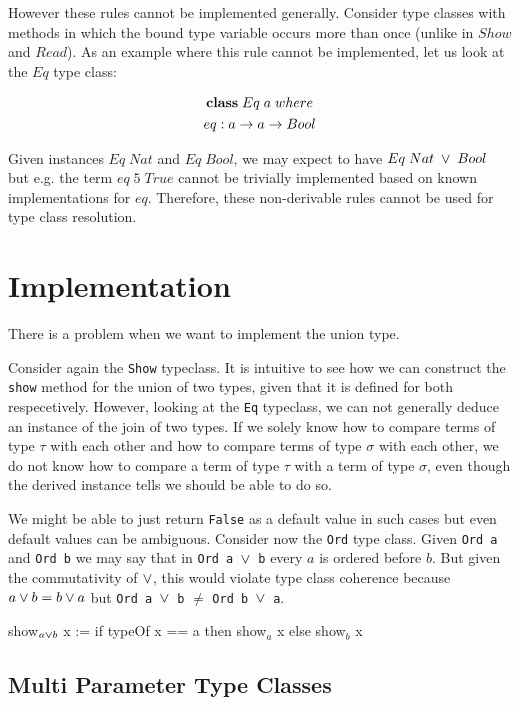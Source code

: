 However these rules cannot be implemented generally.
Consider type classes with methods in which the bound type variable occurs more than once (unlike in $Show$ and $Read$).
As an example where this rule cannot be implemented, let us look at the $Eq$ type class:

\begin{gather}
\nonumber {\bf class} \; Eq \; a \; where\\
\nonumber  eq : a \to a \to Bool
\end{gather}

Given instances $Eq \; Nat$ and $Eq \; Bool$, we may expect to have $Eq \; Nat \; \vee \; Bool$ but e.g. the term $eq \; 5 \; True$ cannot be trivially implemented based on known implementations for $eq$.
Therefore, these non-derivable rules cannot be used for type class resolution.

\section{Implementation}

There is a problem when we want to implement the union type.

Consider again the \texttt{Show} typeclass. It is intuitive to see how we can construct the \texttt{show} method for the union of two types, given that it is defined for both respecetively.
However, looking at the \texttt{Eq} typeclass, we can not generally deduce an instance of the join of two types.
If we solely know how to compare terms of type $\tau$ with each other and how to compare terms of type $\sigma$ with each other,
we do not know how to compare a term of type $\tau$ with a term of type $\sigma$, even though the derived instance tells we should be able to do so.

We might be able to just return \texttt{False} as a default value in such cases but even default values can be ambiguous.
Consider now the \texttt{Ord} type class. Given \texttt{Ord a} and \texttt{Ord b} we may say that in \texttt{Ord a $\vee$ b} every $a$ is ordered before $b$.
But given the commutativity of $\vee$, this would violate type class coherence because $a \vee b = b \vee a$ but \texttt{Ord a $\vee$ b} $\neq$ \texttt{Ord b $\vee$ a}.

\begin{listing}
  show$_{a\join b}$ x := if typeOf x == a then show$_a$ x else show$_b$ x
\end{listing}


\subsection{Multi Parameter Type Classes}

